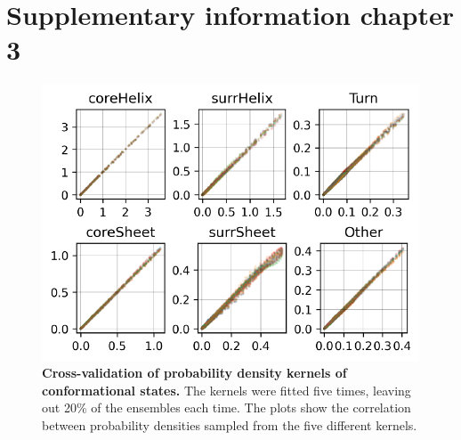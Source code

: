 

\chapter*{Supplementary information chapter 3}
\setcounter{chapter}{3}

\begingroup
\setcounter{table}{0}
\setcounter{figure}{0}

\captionsetup[table]{name=Supplementary Table}
\captionsetup[figure]{name=Supplementary Fig.}

\begin{figure}[H]
    \centering
    \includegraphics[width=\linewidth]{constava/sup_figs/supfig1.pdf}
    \caption{\textbf{Cross-validation of probability density kernels of conformational states.} The kernels were fitted five times, leaving out 20\% of the ensembles each time. The plots show the correlation between probability densities sampled from the five different kernels.}
    \label{fig:sup_fig_constava:cross_validation}
\end{figure}


